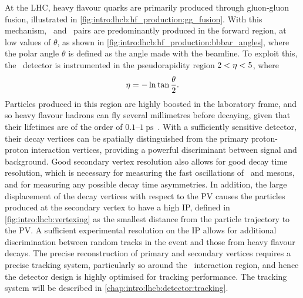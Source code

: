 At the \ac{LHC}, heavy flavour quarks are primarily produced through 
gluon-gluon fusion, illustrated in 
\cref{fig:intro:lhcb:hf_production:gg_fusion}.
With this mechanism, \bbbar\ and \ccbar\ pairs are predominantly produced in 
the forward region, at low values of $\theta$, as shown in 
\cref{fig:intro:lhcb:hf_production:bbbar_angles}, where the polar angle 
$\theta$ is defined as the angle made with the beamline.
To exploit this, the \lhcb\ detector is instrumented in the pseudorapidity 
region $2 < \eta < 5$, where
\begin{equation}
  \eta = -\ln{\tan{\frac{\theta}{2}}}.
\end{equation}
Particles produced in this region are highly boosted in the laboratory frame, 
and so heavy flavour hadrons can fly several millimetres before decaying, given 
that their lifetimes are of the order of 
$0.1$--$\SI{1}{\pico\second}$~\cite{PDG2014}.
With a sufficiently sensitive detector, their decay vertices can be spatially 
distinguished from the primary proton-proton interaction vertices, providing a 
powerful discriminant between signal and background.
Good secondary vertex resolution also allows for good decay time resolution, 
which is necessary for measuring the fast oscillations of \PBds\ and \PDzero 
mesons, and for measuring any possible decay time asymmetries.
In addition, the large displacement of the decay vertices with respect to the 
\ac{PV} causes the particles produced at the secondary vertex to have a high 
\ac{IP}, defined in \cref{fig:intro:lhcb:vertexing} as the smallest distance 
from the particle trajectory to the \ac{PV}.
A sufficient experimental resolution on the \ac{IP} allows for additional 
discrimination between random tracks in the event and those from heavy flavour 
decays.
The precise reconstruction of primary and secondary vertices requires a precise 
tracking system, particularly so around the \pp\ interaction region, and hence 
the detector design is highly optimised for tracking performance.
The tracking system will be described in 
\cref{chap:intro:lhcb:detector:tracking}.

